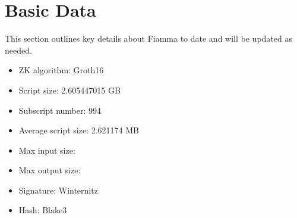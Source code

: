 \section{Basic Data} \label{sec:basic data}
This section outlines key details about Fiamma to date and will be updated as needed.

\begin{itemize}
\item ZK algorithm: Groth16 \cite{website:Groth16}
\item Script size: 2.605447015 GB
\item Subscript number: 994
\item Average script size: 2.621174 MB
\item Max input size: 
\item Max output size:
\item Signature: Winternitz
\item Hash: Blake3
\end{itemize}
